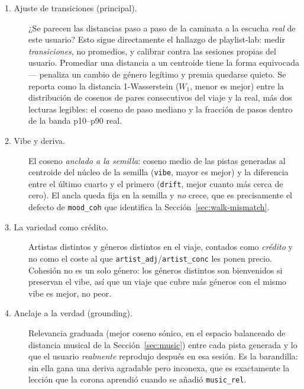 \documentclass[11pt]{article}
\begin{document}
\begin{description}
  \item[1. Ajuste de transiciones (principal).] ¿Se parecen las distancias
  paso a paso de la caminata a la escucha \emph{real} de este usuario? Esto
  sigue directamente el hallazgo de playlist-lab: medir \emph{transiciones}, no
  promedios, y calibrar contra las sesiones propias del usuario. Promediar una
  distancia a un centroide tiene la forma equivocada --- penaliza un cambio de
  género legítimo y premia quedarse quieto. Se reporta como la distancia
  1-Wasserstein ($W_1$, menor es mejor) entre la distribución de cosenos de
  pares consecutivos del viaje y la real, más dos lecturas legibles: el coseno
  de paso mediano y la fracción de pasos dentro de la banda p10--p90 real.
  \item[2. Vibe y deriva.] El coseno \emph{anclado a la semilla}: coseno medio
  de las pistas generadas al centroide del núcleo de la semilla (\texttt{vibe},
  mayor es mejor) y la diferencia entre el último cuarto y el primero
  (\texttt{drift}, mejor cuanto más cerca de cero). El ancla queda fija en la
  semilla y \emph{no} crece, que es precisamente el defecto de
  \texttt{mood\_coh} que identifica la Sección~\ref{sec:walk-mismatch}.
  \item[3. La variedad como crédito.] Artistas distintos y géneros distintos en
  el viaje, contados como \emph{crédito} y no como el coste al que
  \texttt{artist\_adj}/\texttt{artist\_conc} les ponen precio. Cohesión no es un
  solo género: los géneros distintos son bienvenidos si preservan el vibe, así
  que un viaje que cubre más géneros con el mismo vibe es mejor, no peor.
  \item[4. Anclaje a la verdad (grounding).] Relevancia graduada (mejor coseno
  sónico, en el espacio balanceado de distancia musical de la
  Sección~\ref{sec:music}) entre cada pista generada y lo que el usuario
  \emph{realmente} reprodujo después en esa sesión. Es la barandilla: sin ella
  gana una deriva agradable pero inconexa, que es exactamente la lección que la
  corona aprendió cuando se añadió \texttt{music\_rel}.
\end{description}
\end{document}
